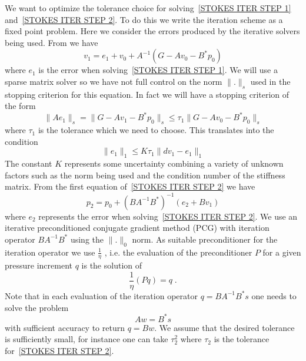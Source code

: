 We want to optimize the tolerance choice for solving~\ref{STOKES ITER STEP 1}
and~\ref{STOKES ITER STEP 2}. To do this we write the iteration scheme as a
fixed point problem. Here we consider the errors produced by the iterative
solvers being used.
From  we have
\begin{equation} \label{STOKES total V1}
v_{1} = e_{1} + v_{0} + A^{-1} ( G - Av_{0} - B^{*} p_{0} ) 
\end{equation}
where $e_{1}$ is the error when solving~\ref{STOKES ITER STEP 1}.
We will use a sparse matrix solver so we have not full control on the norm
$\|.\|_{s}$ used in the stopping criterion for this equation.
In fact we will have a stopping criterion of the form
\begin{equation} 
\| A e_{1} \|_{s}  = \| G - A v_{1} - B^{*} p_{0} \|_{s} \le \tau_{1} \| G - A v_{0} - B^{*} p_{0} \|_{s} 
\end{equation}
where $\tau_{1}$ is the tolerance which we need to choose.
This translates into the condition
\begin{equation} 
\| e_{1} \|_{1} \le K \tau_{1} \| dv_{1} - e_{1} \|_{1} 
\end{equation}
The constant $K$ represents some uncertainty combining a variety of unknown
factors such as the norm being used and the condition number of the stiffness matrix.
From the first equation of~\ref{STOKES ITER STEP 2} we have
\begin{equation}\label{STOKES total P2}
p_{2} =  p_{0} + (B A^{-1} B^{*})^{-1} (e_{2} + Bv_{1} )
\end{equation}
where $e_{2}$ represents the error when solving~\ref{STOKES ITER STEP 2}.
We use an iterative preconditioned conjugate gradient method
(PCG) with iteration operator
$B A^{-1} B^{*}$ using the $\|.\|_{0}$ norm.
As suitable preconditioner for the iteration operator we
use $\frac{1}{\eta}$ \cite{ELMAN}, i.e. the evaluation of the preconditioner
$P$ for a given pressure increment $q$ is the solution of
\begin{equation} \label{STOKES P PREC}
\frac{1}{\eta} (Pq) = q \; . 
\end{equation}
Note that in each evaluation of the iteration operator $q=B A^{-1} B^{*} s$
one needs to solve the problem
\begin{equation} \label{STOKES P OPERATOR}
A w = B^{*} s 
\end{equation}
with sufficient accuracy to return $q=Bw$. We assume that the desired
tolerance is sufficiently small, for instance one can take $\tau_{2}^2$ where
$\tau_{2}$ is the tolerance for~\ref{STOKES ITER STEP 2}.

